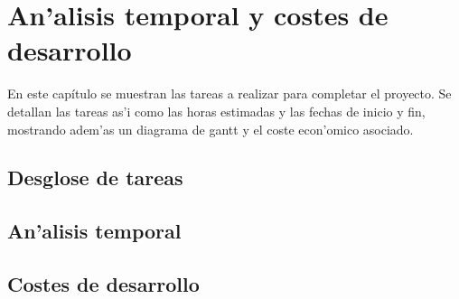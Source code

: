 \chapter{An'alisis temporal y costes de desarrollo}\label{cap6}

En este capítulo se muestran las tareas a realizar para completar el proyecto. 
Se detallan las tareas as'i como las horas estimadas y las fechas de inicio y fin, mostrando adem'as un diagrama de gantt y el coste econ'omico asociado.


\section{Desglose de tareas}\label{sec:desglose}




\section{An'alisis temporal}\label{sec:temporal}




\section{Costes de desarrollo}\label{sec:costes}



